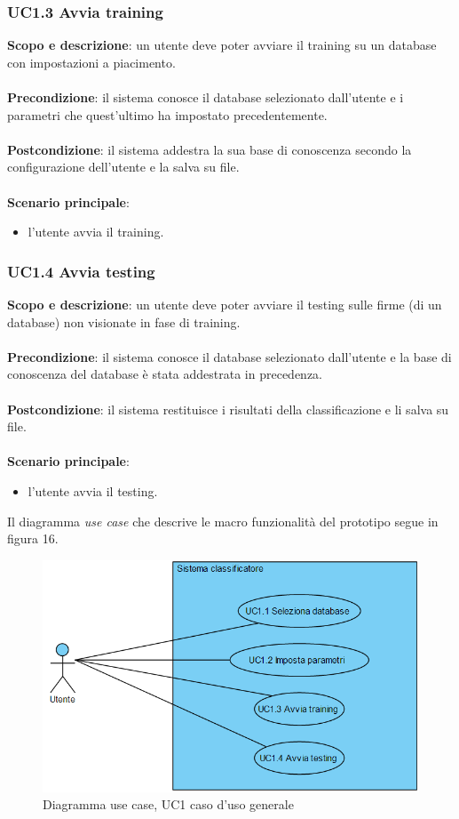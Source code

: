 \subsubsection*{UC1.3 Avvia training}
\label{3.2.1.2}
\textbf{Scopo e descrizione}: un utente deve poter avviare il training su un database con impostazioni a piacimento.\\\\
\textbf{Precondizione}: il sistema conosce il database selezionato dall'utente e i parametri che quest'ultimo ha impostato precedentemente.\\\\
\textbf{Postcondizione}: il sistema addestra la sua base di conoscenza secondo la configurazione dell'utente e la salva su file.\\\\
\textbf{Scenario principale}:
\begin{itemize}
\item l'utente avvia il training.
\end{itemize}
\subsubsection*{UC1.4 Avvia testing}
\label{3.2.1.3}
\textbf{Scopo e descrizione}: un utente deve poter avviare il testing sulle firme (di un database) non visionate in fase di training.\\\\
\textbf{Precondizione}: il sistema conosce il database selezionato dall'utente e la base di conoscenza del database è stata addestrata in precedenza.\\\\
\textbf{Postcondizione}: il sistema restituisce i risultati della classificazione e li salva su file.\\\\
\textbf{Scenario principale}:
\begin{itemize}
\item l'utente avvia il testing.
\end{itemize}
Il diagramma \emph{use case} che descrive le macro funzionalità del prototipo segue in figura 16.
\begin{figure}[H]
\centering
\includegraphics[scale=0.7]{../capitolo3img/uc1.png}
\caption{Diagramma use case, UC1 caso d'uso generale}
\end{figure}


